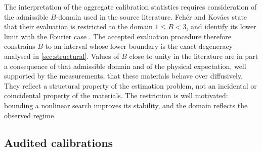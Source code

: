 \documentclass[preprint,12pt,a4paper]{elsarticle}
\theoremstyle{plain}
\theoremstyle{definition}
\theoremstyle{remark}
\newcommand{\Bnum}{B}
\begin{document}
The interpretation of the aggregate calibration statistics requires
consideration of the admissible $\Bnum$-domain used in the source literature.
Feh\'er and Kov\'acs state that their
evaluation is restricted to the domain $1 \leq \Bnum < 3$, and identify its
lower limit with the Fourier case
\cite{FeherKovacs2021}. The accepted evaluation procedure therefore constrains
$\Bnum$ to an interval whose lower boundary is the exact degeneracy analysed in
\cref{sec:structural}. Values of $\Bnum$ close to unity in the literature are
in part a consequence of that admissible domain and of the physical
expectation, well supported by the measurements, that these materials behave
over diffusively. They reflect a structural property of the estimation
problem, not an incidental or coincidental property of the materials. The
restriction is well motivated: bounding a nonlinear search improves its
stability, and the domain reflects the observed regime.

\subsection{Audited calibrations}
\label{sec:cal-audit}
\end{document}
